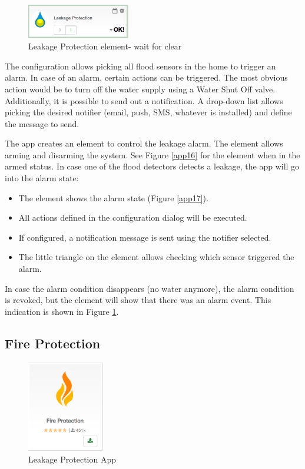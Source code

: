 \begin{figure}
\begin{center}
\includegraphics[width=0.4\textwidth]{pngs/cap6/app18.png}
\caption{Leakage Protection element- wait for clear}
\label{app18}
\end{center}
\end{figure}

The configuration allows picking all flood sensors in the home to trigger an alarm. In 
case of an alarm, certain actions can be triggered. The most obvious action would be to 
turn off the water supply using a Water Shut Off valve.
Additionally, it is possible to send out a notification. A drop-down list allows picking 
the desired notifier (email, push, SMS, whatever is installed) and define the message 
to send.

The app creates an element to control the leakage alarm. The element allows arming and 
disarming the system. See Figure \ref{app16} for the element when in the armed status. 
In case one of the flood detectors detects a leakage, the app will go into the alarm state:

\begin{itemize}
\item The element shows the alarm state (Figure \ref{app17}).
\item All actions defined in the configuration dialog will be executed.
\item If configured, a notification message is sent using the notifier selected.
\item The little triangle on the element allows checking which sensor triggered the alarm.
\end{itemize}

In case the alarm condition disappears (no water anymore), the alarm condition is revoked, 
but the element will show that there was an alarm event. This indication is shown in 
Figure \ref{app18}.


\subsection{Fire Protection}

\begin{figure}
\begin{center}
\includegraphics[width=0.3\textwidth]{pngs/cap6/app20.png}
\caption{Leakage Protection App}
\label{app20}
\end{center}
\end{figure}

